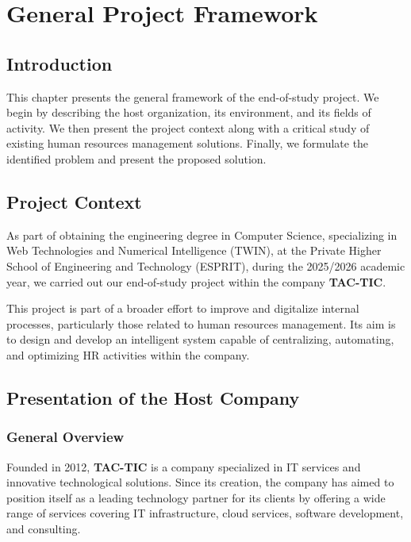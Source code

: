 \chapter{General Project Framework}

\section*{Introduction}

This chapter presents the general framework of the end-of-study project. We begin by describing the host organization, its environment, and its fields of activity. We then present the project context along with a critical study of existing human resources management solutions. Finally, we formulate the identified problem and present the proposed solution.

\section{Project Context}

As part of obtaining the engineering degree in Computer Science, specializing in Web Technologies and Numerical Intelligence (TWIN), at the Private Higher School of Engineering and Technology (ESPRIT), during the 2025/2026 academic year, we carried out our end-of-study project within the company \textbf{TAC-TIC}.

This project is part of a broader effort to improve and digitalize internal processes, particularly those related to human resources management. Its aim is to design and develop an intelligent system capable of centralizing, automating, and optimizing HR activities within the company.

\section{Presentation of the Host Company}

\subsection{General Overview}

Founded in 2012, \textbf{TAC-TIC} is a company specialized in IT services and innovative technological solutions. Since its creation, the company has aimed to position itself as a leading technology partner for its clients by offering a wide range of services covering IT infrastructure, cloud services, software development, and consulting.

